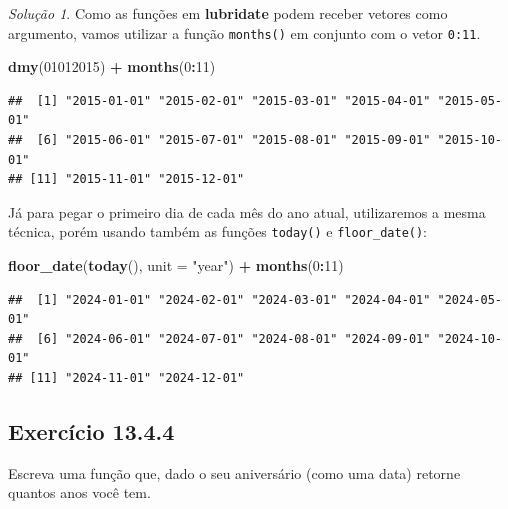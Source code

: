 \documentclass[
]{latex/krantz}
\newenvironment{Shaded}{\begin{snugshade}}{\end{snugshade}}
\newcommand{\AttributeTok}[1]{\textcolor[rgb]{0.13,0.29,0.53}{#1}}
\newcommand{\DecValTok}[1]{\textcolor[rgb]{0.00,0.00,0.81}{#1}}
\newcommand{\FunctionTok}[1]{\textcolor[rgb]{0.13,0.29,0.53}{\textbf{#1}}}
\newcommand{\NormalTok}[1]{#1}
\newcommand{\SpecialCharTok}[1]{\textcolor[rgb]{0.81,0.36,0.00}{\textbf{#1}}}
\newcommand{\StringTok}[1]{\textcolor[rgb]{0.31,0.60,0.02}{#1}}
\theoremstyle{definition}
\theoremstyle{definition}
\theoremstyle{definition}
\theoremstyle{definition}
\theoremstyle{remark}
\newtheorem*{solution}{Solução}
\begin{document}
\begin{solution}

Como as funções em \textbf{lubridate} podem receber vetores como argumento, vamos utilizar a função \texttt{months()} em conjunto com o vetor \texttt{0:11}.

\begin{Shaded}
\begin{Highlighting}[]
\FunctionTok{dmy}\NormalTok{(}\DecValTok{01012015}\NormalTok{) }\SpecialCharTok{+} \FunctionTok{months}\NormalTok{(}\DecValTok{0}\SpecialCharTok{:}\DecValTok{11}\NormalTok{)}
\end{Highlighting}
\end{Shaded}

\begin{verbatim}
##  [1] "2015-01-01" "2015-02-01" "2015-03-01" "2015-04-01" "2015-05-01"
##  [6] "2015-06-01" "2015-07-01" "2015-08-01" "2015-09-01" "2015-10-01"
## [11] "2015-11-01" "2015-12-01"
\end{verbatim}

Já para pegar o primeiro dia de cada mês do ano atual, utilizaremos a mesma técnica, porém usando também as funções \texttt{today()} e \texttt{floor\_date()}:

\begin{Shaded}
\begin{Highlighting}[]
\FunctionTok{floor\_date}\NormalTok{(}\FunctionTok{today}\NormalTok{(), }\AttributeTok{unit =} \StringTok{"year"}\NormalTok{) }\SpecialCharTok{+} \FunctionTok{months}\NormalTok{(}\DecValTok{0}\SpecialCharTok{:}\DecValTok{11}\NormalTok{)}
\end{Highlighting}
\end{Shaded}

\begin{verbatim}
##  [1] "2024-01-01" "2024-02-01" "2024-03-01" "2024-04-01" "2024-05-01"
##  [6] "2024-06-01" "2024-07-01" "2024-08-01" "2024-09-01" "2024-10-01"
## [11] "2024-11-01" "2024-12-01"
\end{verbatim}

\end{solution}

\hypertarget{exr13-4-4}{%
\subsection*{Exercício 13.4.4}\label{exr13-4-4}}

Escreva uma função que, dado o seu aniversário (como uma data) retorne quantos anos você tem.
\end{document}
